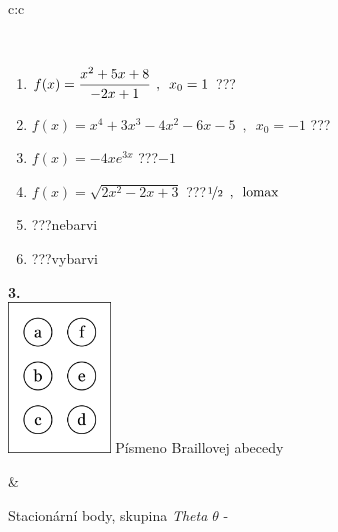 \documentclass[10pt]{report}
\begin{document}
\begin{tabular}{c:c}
\begin{minipage}[c][104.5mm][t]{0.5\linewidth}
\begin{center}
\begin{minipage}{0.95\linewidth}
\begin{center}
\end{center}
\end{minipage}
\\[1mm]
\begin{minipage}{0.79\linewidth}
\begin{center}
\begin{varwidth}{\linewidth}
\begin{enumerate}
\normalsize
\item $f(x)=\cfrac{x^2+5x+8}{-2x+1}\enspace , \enspace x_0=1$\quad \dotfill\; ???\;\dotfill \quad {}
\item $f(x)=x^4+3x^3-4x^2-6x-5\enspace , \enspace x_0=-1$\quad \dotfill\; ???\;\dotfill \quad {}
\item $f(x)=-4xe^{3x}$\quad \dotfill\; ???\;\dotfill \quad $-1$
\item $f(x)=\sqrt{2x^2-2x+3}$\quad \dotfill\; ???\;\dotfill \quad $\nicefrac{1}{2}\enspace , \enspace\mathrm{lomax}$
\item \quad \dotfill\; ???\;\dotfill \quad nebarvi
\item \quad \dotfill\; ???\;\dotfill \quad vybarvi
\end{enumerate}
\end{varwidth}
\end{center}
\end{minipage}
\begin{minipage}{0.20\linewidth}
\begin{center}
{\Huge\bfseries 3.} \\[2mm]
\includegraphics[height=40mm]{../images/braille.png}
{\small Písmeno Braillovej abecedy}
\end{center}
\end{minipage}
\end{center}
\end{minipage}
&
\begin{minipage}[c][104.5mm][t]{0.5\linewidth}
\begin{center}
\vspace{7mm}
{\huge Stacionární body, skupina \textit{Theta $\theta$} -}\\[5mm]

\end{center}
\end{minipage}
\end{tabular}
\end{document}
